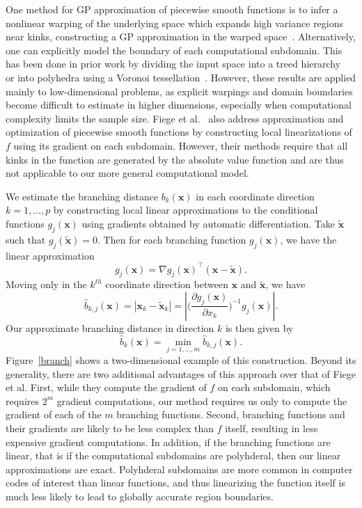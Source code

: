 \documentclass{article}
\newcommand{\abs}[1]{\left|#1\right|}
\renewcommand{\vec}[1]{\mathbf{#1}}
\numberwithin{equation}{section}
\begin{document}
One method for GP approximation of piecewise smooth functions is to infer a nonlinear warping of the underlying space which expands high variance regions near kinks, constructing a GP approximation in the warped space~\cite{marmin2018warped, xiong2007non}. Alternatively, one can explicitly model the boundary of each computational subdomain. This has been done in prior work by dividing the input space into a treed hierarchy~\cite{gramacy2008bayesian} or into polyhedra using a Voronoi tessellation~\cite{kim2005analyzing}. However, these results are applied mainly to low-dimensional problems, as explicit warpings and domain boundaries become difficult to estimate in higher dimensions, especially when computational complexity limits the sample size. Fiege et al.~\cite{fiege2018algorithmic} also address approximation and optimization of piecewise smooth functions by constructing local linearizations of $f$ using its gradient on each subdomain. However, their methods require that all kinks in the function are generated by the absolute value function and are thus not applicable to our more general computational model.

We estimate the branching distance $b_k(\vec{x})$ in each coordinate direction $k=1,...,p$ by constructing local linear approximations to the conditional functions $g_j(\vec{x})$ using gradients obtained by automatic differentiation. Take $\tilde{\vec{x}}$ such that $g_j(\tilde{\vec{x}}) = 0$. Then for each branching function $g_j(\vec{x})$, we have the linear approximation
$$ g_j(\vec{x}) = \nabla g_j(\vec{x})^\top (\vec{x} - \tilde{\vec{x}}). $$
Moving only in the $k^{th}$ coordinate direction between $\vec{x}$ and $\tilde{\vec{x}}$, we have
$$ \hat{b}_{k,j}(\vec{x}) = \abs{\vec{x}_k - \tilde{\vec{x}}_k} = \abs{\bigg(\frac{\partial g_j(\vec{x})}{\partial x_k}\bigg)^{-1} g_j(\vec{x})}. $$
Our approximate branching distance in direction $k$ is then given by
$$ \hat{b}_k(\vec{x}) = \min_{j=1,...,m} \hat{b}_{k,j}(\vec{x}). $$
Figure~\ref{branch} shows a two-dimensional example of this construction. Beyond its generality, there are two additional advantages of this approach over that of Fiege et al. First, while they compute the gradient of $f$ on each subdomain, which requires $2^m$ gradient computations, our method requires us only to compute the gradient of each of the $m$ branching functions. Second, branching functions and their gradients are likely to be less complex than $f$ itself, resulting in less expensive gradient computations. In addition, if the branching functions are linear, that is if the computational subdomains are polyhderal, then our linear approximations are exact. Polyhderal subdomains are more common in computer codes of interest than linear functions, and thus linearizing the function itself is much less likely to lead to globally accurate region boundaries.
\end{document}
